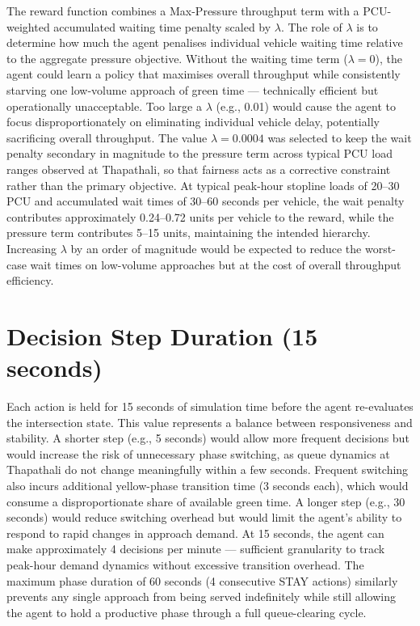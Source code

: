 The reward function combines a Max-Pressure throughput term with a PCU-weighted accumulated waiting time penalty scaled by \( \lambda \). The role of \( \lambda \) is to determine how much the agent penalises individual vehicle waiting time relative to the aggregate pressure objective. Without the waiting time term (\( \lambda = 0 \)), the agent could learn a policy that maximises overall throughput while consistently starving one low-volume approach of green time — technically efficient but operationally unacceptable. Too large a \( \lambda \) (e.g., 0.01) would cause the agent to focus disproportionately on eliminating individual vehicle delay, potentially sacrificing overall throughput. The value \( \lambda = 0.0004 \) was selected to keep the wait penalty secondary in magnitude to the pressure term across typical PCU load ranges observed at Thapathali, so that fairness acts as a corrective constraint rather than the primary objective. At typical peak-hour stopline loads of 20–30 PCU and accumulated wait times of 30–60 seconds per vehicle, the wait penalty contributes approximately 0.24–0.72 units per vehicle to the reward, while the pressure term contributes 5–15 units, maintaining the intended hierarchy. Increasing \( \lambda \) by an order of magnitude would be expected to reduce the worst-case wait times on low-volume approaches but at the cost of overall throughput efficiency.

\section{Decision Step Duration (15 seconds)}

Each action is held for 15 seconds of simulation time before the agent re-evaluates the intersection state. This value represents a balance between responsiveness and stability. A shorter step (e.g., 5 seconds) would allow more frequent decisions but would increase the risk of unnecessary phase switching, as queue dynamics at Thapathali do not change meaningfully within a few seconds. Frequent switching also incurs additional yellow-phase transition time (3 seconds each), which would consume a disproportionate share of available green time. A longer step (e.g., 30 seconds) would reduce switching overhead but would limit the agent's ability to respond to rapid changes in approach demand. At 15 seconds, the agent can make approximately 4 decisions per minute — sufficient granularity to track peak-hour demand dynamics without excessive transition overhead. The maximum phase duration of 60 seconds (4 consecutive STAY actions) similarly prevents any single approach from being served indefinitely while still allowing the agent to hold a productive phase through a full queue-clearing cycle.

